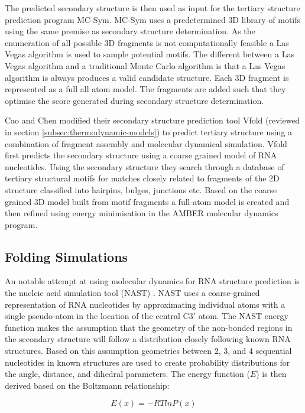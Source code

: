 \documentclass[journal]{IEEEtran}
\begin{document}
The predicted secondary structure is then used as input for the tertiary structure prediction program MC-Sym. MC-Sym uses a predetermined 3D library of motifs using the same premise as secondary structure determination. As the enumeration of all possible 3D fragments is not computationally feasible a Las Vegas algorithm is used to sample potential motifs. The different between a Las Vegas algorithm and a traditional Monte Carlo algorithm is that a Las Vegas algorithm is always produces a valid candidate structure. Each 3D fragment is represented as a full all atom model. The fragments are added such that they optimise the score generated during secondary structure determination.

Cao and Chen \cite{cao2011physics} modified their secondary structure prediction tool Vfold \cite{cao2005predicting} (reviewed in section \ref{subsec:thermodynamic-models}) to predict tertiary structure using a combination of fragment assembly and molecular dynamical simulation. Vfold first predicts the secondary structure using a coarse grained model of RNA nucleotides. Using the secondary structure they search through a database of tertiary structural motifs for matches closely related to fragments of the 2D structure classified into hairpins, bulges, junctions etc. Based on the coarse grained 3D model built from motif fragments a full-atom model is created and then refined using energy minimisation in the AMBER \cite{case2010amber}  molecular dynamics program. 

\subsection{Folding Simulations}
An notable attempt at using molecular dynamics for RNA structure prediction is the nucleic acid simulation tool (NAST) \cite{jonikas2009coarse}. NAST uses a coarse-grained representation of RNA nucleotides by approximating individual atoms with a single pseudo-atom in the location of the central C3$'$ atom. The NAST energy function makes the assumption that the geometry of the non-bonded regions in the secondary structure will follow a distribution closely following known RNA structures. Based on this assumption geometries between 2, 3, and 4 sequential nucleotides in known structures are used to create probability distributions for the angle, distance, and dihedral parameters. The energy function ($E$) is then derived based on the Boltzmann relationship:

\begin{equation}
\label{eq:boltzmann-relation}
	E(x) = -RT ln P(x)
\end{equation}
\end{document}

